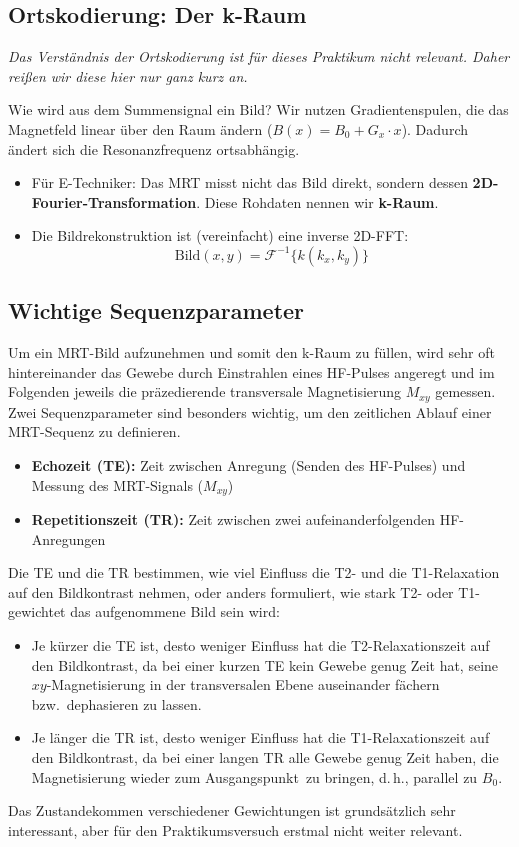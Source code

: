 \documentclass[a4paper,11pt]{article}
\newcommand{\Mxy}{M_{xy}}
\begin{document}
\subsection{Ortskodierung: Der k-Raum}
{\color{dunkel}\itshape Das Verständnis der Ortskodierung ist für dieses Praktikum nicht relevant. Daher reißen wir diese hier nur ganz kurz an.\par}

Wie wird aus dem Summensignal ein Bild? Wir nutzen Gradientenspulen, die das Magnetfeld linear über den Raum ändern ($B(x) = B_0 + G_x \cdot x$). Dadurch ändert sich die Resonanzfrequenz ortsabhängig.
\begin{itemize}
\item Für E-Techniker: Das MRT misst nicht das Bild direkt, sondern dessen \textbf{2D-Fourier-Transformation}. Diese Rohdaten nennen wir \textbf{k-Raum}.
\item Die Bildrekonstruktion ist (vereinfacht) eine inverse 2D-FFT:
\[
\mathrm{Bild}(x, y) = \mathcal{F}^{-1}\bigl\{k(k_x, k_y)\bigr\}
\]
\end{itemize}

\subsection{Wichtige Sequenzparameter}
Um ein MRT-Bild aufzunehmen und somit den k-Raum zu füllen, wird sehr oft hintereinander das Gewebe durch Einstrahlen eines HF-Pulses angeregt und im Folgenden jeweils die präzedierende transversale Magnetisierung $\Mxy$ gemessen. Zwei Sequenzparameter sind besonders wichtig, um den zeitlichen Ablauf einer MRT-Sequenz zu definieren.
\begin{itemize}
\item \textbf{Echozeit (TE):} Zeit zwischen Anregung (Senden des HF-Pulses) und Messung des MRT-Signals ($\Mxy$)
\item \textbf{Repetitionszeit (TR):} Zeit zwischen zwei aufeinanderfolgenden HF-Anregungen
\end{itemize}
Die TE und die TR bestimmen, wie viel Einfluss die T2- und die T1-Relaxation auf den Bildkontrast nehmen, oder anders formuliert, wie stark T2- oder T1-gewichtet das aufgenommene Bild sein wird:
\begin{itemize}
\item Je kürzer die TE ist, desto weniger Einfluss hat die T2-Relaxationszeit auf den Bildkontrast, da bei einer kurzen TE kein Gewebe genug \glqq Zeit hat\grqq, seine $xy$-Magnetisierung in der transversalen Ebene auseinander fächern bzw.\ dephasieren zu lassen.
\item Je länger die TR ist, desto weniger Einfluss hat die T1-Relaxationszeit auf den Bildkontrast, da bei einer langen TR alle Gewebe genug Zeit haben, die Magnetisierung wieder zum \glqq Ausgangspunkt\grqq\ zu bringen, d.\,h., parallel zu $B_0$.
\end{itemize}
Das Zustandekommen verschiedener Gewichtungen ist grundsätzlich sehr interessant, aber für den Praktikumsversuch erstmal nicht weiter relevant.
\end{document}
